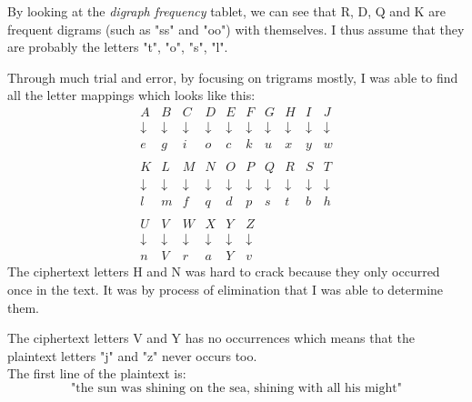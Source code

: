 \documentclass{article}
\begin{document}
	By looking at the \textit{digraph frequency} tablet, we can see that R, D, Q and K are frequent digrams (such as "ss" and "oo")  with themselves. I thus assume that they are probably the letters "t", "o", "s", "l".
	
	Through much trial and error, by focusing on trigrams mostly, I was able to find all the letter mappings which looks like this:
	\[
	\begin{matrix}
	A&B&C&D&E&F&G&H&I&J \\ 
	\downarrow&\downarrow&\downarrow&\downarrow&\downarrow&\downarrow&\downarrow&\downarrow&\downarrow&\downarrow \\
	e&g&i&o&c&k&u&x&y&w \\ \\
	K&L&M&N&O&P&Q&R&S&T \\ 
	\downarrow&\downarrow&\downarrow&\downarrow&\downarrow&\downarrow&\downarrow&\downarrow&\downarrow&\downarrow \\
	l&m&f&q&d&p&s&t&b&h \\ \\
	U&V&W&X&Y&Z \\
	\downarrow&\downarrow&\downarrow&\downarrow&\downarrow&\downarrow \\
	n&V&r&a&Y&v 
	\end{matrix}
	\]
	The ciphertext letters H and N was hard to crack because they only occurred once in the text. It was by process of elimination that I was able to determine them.
	
	The ciphertext letters V and Y has no occurrences which means that the plaintext letters "j" and "z" never occurs too. \\
	
	The first line of the plaintext is: 
	$$
	\text{"the sun was shining on the sea, shining with all his might"}
	$$
	
\end{document}

